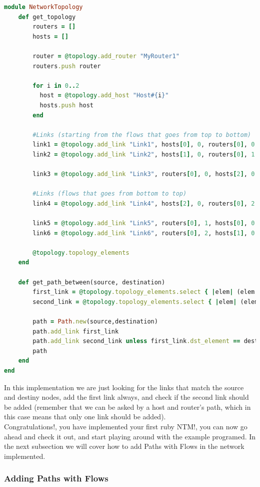 \begin{lstlisting}[language=Ruby,breaklines=true]
module NetworkTopology
	def get_topology
		routers = []
        hosts = []

        router = @topology.add_router "MyRouter1"
        routers.push router

        for i in 0..2  
          host = @topology.add_host "Host#{i}"
          hosts.push host     
        end
        
        #Links (starting from the flows that goes from top to bottom)    
        link1 = @topology.add_link "Link1", hosts[0], 0, routers[0], 0
        link2 = @topology.add_link "Link2", hosts[1], 0, routers[0], 1

        link3 = @topology.add_link "Link3", routers[0], 0, hosts[2], 0

        #Links (flows that goes from bottom to top)    
        link4 = @topology.add_link "Link4", hosts[2], 0, routers[0], 2

        link5 = @topology.add_link "Link5", routers[0], 1, hosts[0], 0
        link6 = @topology.add_link "Link6", routers[0], 2, hosts[1], 0
        
        @topology.topology_elements
	end
    
    def get_path_between(source, destination)
    	first_link = @topology.topology_elements.select { |elem| (elem.is_a? Link) && (elem.src_element == source) }.first
        second_link = @topology.topology_elements.select { |elem| (elem.is_a? Link) && (elem.dst_element == destination) }.first

        path = Path.new(source,destination)        
        path.add_link first_link
        path.add_link second_link unless first_link.dst_element == destination
        path
    end
end
\end{lstlisting}

In this implementation we are just looking for the links that match the source and destiny nodes, add the first link always, and check if the second link should be added (remember that we can be asked by a host and router's path, which in this case means that only one link should be added). \\

Congratulations!, you have implemented your first ruby NTM!, you can now go ahead and check it out, and start playing around with the example programed. In the next subsection we will cover how to add Paths with Flows in the network implemented.

\subsubsection{Adding Paths with Flows}

